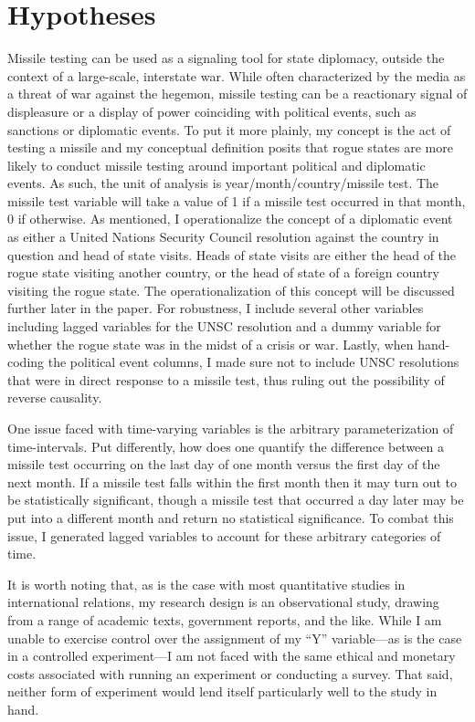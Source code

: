 \documentclass[12pt]{article}
\begin{document}
\section{Hypotheses}
Missile testing can be used as a signaling tool for state diplomacy, outside the context of a large-scale, interstate war. While often characterized by the media as a threat of war against the hegemon, missile testing can be a reactionary signal of displeasure or a display of power coinciding with political events, such as sanctions or diplomatic events. To put it more plainly, my concept is the act of testing a missile and my conceptual definition posits that rogue states are more likely to conduct missile testing around important political and diplomatic events. As such, the unit of analysis is year/month/country/missile test. The missile test variable will take a value of 1 if a missile test occurred in that month, 0 if otherwise. As mentioned, I operationalize the concept of a diplomatic event as either a United Nations Security Council resolution against the country in question and head of state visits. Heads of state visits are either the head of the rogue state visiting another country, or the head of state of a foreign country visiting the rogue state. The operationalization of this concept will be discussed further later in the paper. For robustness, I include several other variables including lagged variables for the UNSC resolution and a dummy variable for whether the rogue state was in the midst of a crisis or war. Lastly, when hand-coding the political event columns, I made sure not to include UNSC resolutions that were in direct response to a missile test, thus ruling out the possibility of reverse causality. 

One issue faced with time-varying variables is the arbitrary parameterization of time-intervals. Put differently, how does one quantify the difference between a missile test occurring on the last day of one month versus the first day of the next month. If a missile test falls within the first month then it may turn out to be statistically significant, though a missile test that occurred a day later may be put into a different month and return no statistical significance. To combat this issue, I generated lagged variables to account for these arbitrary categories of time. 

It is worth noting that, as is the case with most quantitative studies in international relations, my research design is an observational study, drawing from a range of academic texts, government reports, and the like. While I am unable to exercise control over the assignment of my “Y” variable—as is the case in a controlled experiment—I am not faced with the same ethical and monetary costs associated with running an experiment or conducting a survey. That said, neither form of experiment would lend itself particularly well to the study in hand.    
\end{document}
